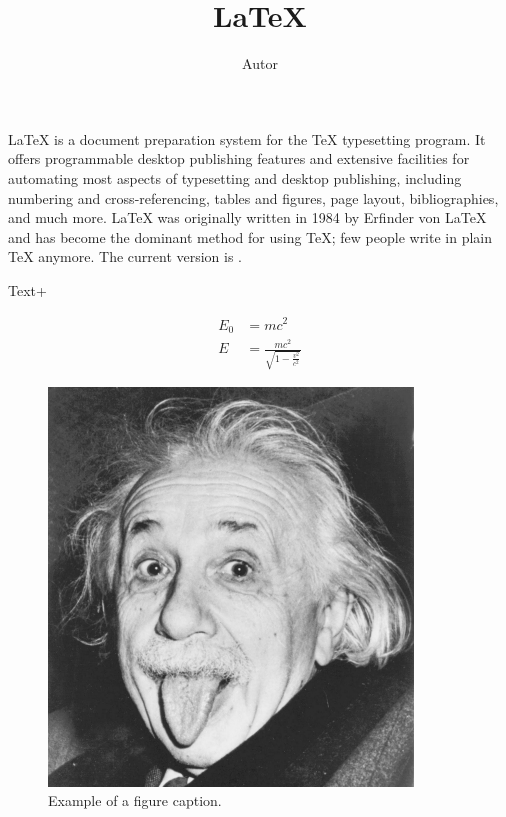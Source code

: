\documentclass{scrarticle}
\title{\LaTeX}
\author{{{Autor}}}
\begin{document}
\maketitle

\LaTeX{} is a document preparation system for the \TeX{} typesetting program. It offers programmable desktop publishing features and extensive facilities for automating most aspects of typesetting and desktop publishing, including numbering and  cross-referencing, tables and figures, page layout, bibliographies, and much more. \LaTeX{} was originally written in 1984 by {{Erfinder von LaTeX}} and has become the  dominant method for using \TeX; few people write in plain \TeX{} anymore. The current version is \LaTeXe.

{{Text+}}

\begin{align}
E_0 &= mc^2 \\
E &= \frac{mc^2}{\sqrt{1-\frac{v^2}{c^2}}}
\end{align}

\begin{figure}[htbp]
\centerline{\includegraphics[width=0.3\linewidth]{einstein}}
\caption{Example of a figure caption.}
\label{fig}
\end{figure}


\end{document}
